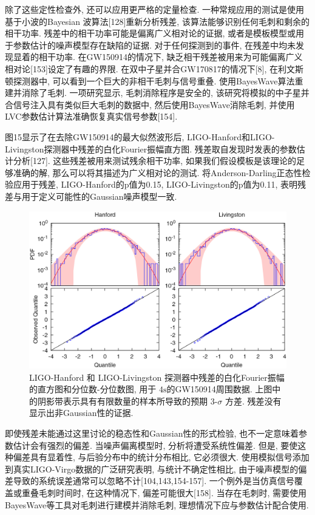 \documentclass[a4paper]{\documentclassname}
\def\t{\text}
\theoremstyle{definition}
\begin{document}
除了这些定性检查外, 还可以应用更严格的定量检查. 一种常规应用的测试是使用基于小波的Bayesian 波算法[128]重新分析残差, 该算法能够识别任何毛刺和剩余的相干功率. 残差中的相干功率可能是偏离广义相对论的证据, 或者是模板模型或用于参数估计的噪声模型存在缺陷的证据. 对于任何探测到的事件, 在残差中均未发现显着的相干功率. 在GW150914的情况下, 缺乏相干残差被用来为可能偏离广义相对论[153]设定了有趣的界限. 在双中子星并合GW170817的情况下[8], 在利文斯顿探测器中, 可以看到一个巨大的非相干毛刺与信号重叠. 使用BayesWave算法重建并消除了毛刺. 一项研究显示, 毛刺消除程序是安全的, 该研究将模拟的中子星并合信号注入具有类似巨大毛刺的数据中, 然后使用BayesWave消除毛刺, 并使用LVC参数估计算法准确恢复真实信号参数[154]. 

图15显示了在去除GW150914的最大似然波形后, LIGO-Hanford和LIGO-Livingston探测器中残差的白化Fourier振幅直方图. 残差取自发现时发表的参数估计分析[127]. 这些残差被用来测试残余相干功率, 如果我们假设模板是该理论的足够准确的解, 那么可以将其描述为广义相对论的测试. 将Anderson-Darling正态性检验应用于残差, LIGO-Hanford的p值为0.15, LIGO-Livingston的p值为0.11, 表明残差与用于定义可能性的Gaussian噪声模型一致. 
\begin{figure}[htbp]
    \centering
    \includegraphics{img/15.jpg}
    \caption{
        LIGO-Hanford 和 LIGO-Livingston 探测器中残差的白化Fourier振幅的直方图和分位数-分位数图, 用于 $4 \t{s}$的GW150914周围数据. 上图中的阴影带表示具有有限数量的样本所导致的预期 3-$\sigma$ 方差. 残差没有显示出非Gaussian性的证据. 
    }
\end{figure}

即使残差未能通过这里讨论的稳态性和Gaussian性的形式检验, 也不一定意味着参数估计会有强烈的偏差. 当噪声偏离模型时, 分析将遭受系统性偏差. 但是, 要使这种偏差具有显着性, 与后验分布中的统计分布相比, 它必须很大. 使用模拟信号添加到真实LIGO-Virgo数据的广泛研究表明, 与统计不确定性相比, 由于噪声模型的偏差导致的系统误差通常可以忽略不计[104,143,154-157]. 一个例外是当仿真信号覆盖或重叠毛刺时间时, 在这种情况下, 偏差可能很大[158]. 当存在毛刺时, 需要使用BayesWave等工具对毛刺进行建模并消除毛刺, 理想情况下应与参数估计配合使用. 
\end{document}
